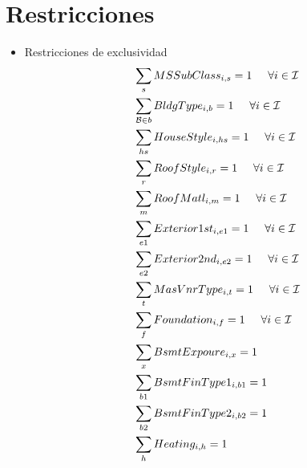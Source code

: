 \section{Restricciones}
\begin{itemize}
    \item {Restricciones de exclusividad}
\begin{align}

    &\sum_{s} MSSubClass_{i,s}=1 \hspace{5mm} \forall i \in \mathcal{I} \\
    
    & \sum_{\mathcal{B}\in b} BldgType_{i,b}= 1 \hspace{5mm} \forall i \in \mathcal{I}\\
    
    & \sum _{hs} HouseStyle_{i,hs}=1\hspace{5mm} \forall i \in \mathcal{I}\\
    
    &\sum_{r} RoofStyle_{i,r}=1\hspace{5mm} \forall i \in \mathcal{I}\\
    
    &\sum_{m} RoofMatl_{i,m}=1\hspace{5mm} \forall i \in \mathcal{I}\\
    
    &\sum_{e1} Exterior1st_{i,e1}=1\hspace{5mm} \forall i \in \mathcal{I}\\
    
    &\sum_{e2} Exterior2nd_{i,e2}=1\hspace{5mm} \forall i \in \mathcal{I}\\
    
    &\sum_{t} MasVnrType_{i,t}=1\hspace{5mm} \forall i \in \mathcal{I}\\
    
    &\sum_{f} Foundation_{i,f}=1\hspace{5mm} \forall i \in \mathcal{I}\\
    
    &\sum_{x} BsmtExpoure_{i,x}=1\\
    
    &\sum_{b1} BsmtFinType1_{i,b1}=1\\
    
    &\sum_{b2} BsmtFinType2_{i,b2}=1\\
    
    &\sum_{h} Heating_{i,h}= 1\\
    

\end{align}
\end{itemize}

